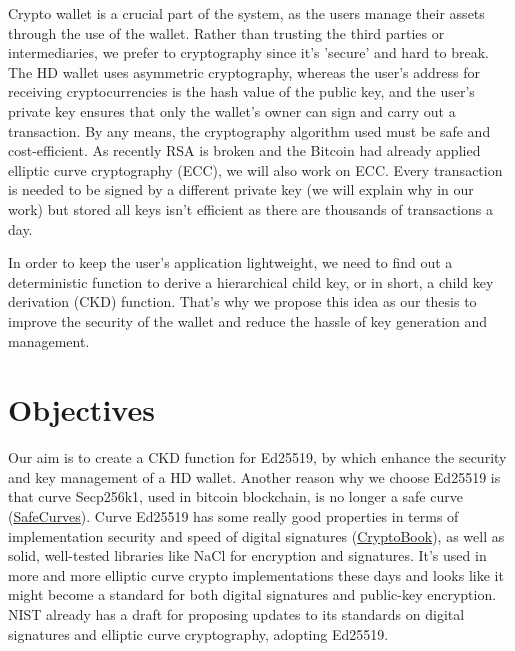 Crypto wallet is a crucial part of the system, as the users manage their assets through the use of the wallet. Rather than trusting the third parties or intermediaries, we prefer to cryptography since it's 'secure' and hard to break. The HD wallet uses asymmetric cryptography, whereas the user's address for receiving cryptocurrencies is the hash value of the public key, and the user's private key ensures that only the wallet's owner can sign and carry out a transaction. By any means, the cryptography algorithm used must be safe and cost-efficient. As recently RSA is broken and the Bitcoin had already applied elliptic curve cryptography (ECC), we will also work on ECC. Every transaction is needed to be signed by a different private key (we will explain why in our work) but stored all keys isn't efficient as there are thousands of transactions a day.

In order to keep the user's application lightweight, we need to find out a deterministic function to derive a hierarchical child key, or in short, a child key derivation (CKD) function. That's why we propose this idea as our thesis to improve the security of the wallet and reduce the hassle of key generation and management.

\section{Objectives}


Our aim is to create a CKD function for Ed25519, by which enhance the security and key management of a HD wallet. Another reason why we choose Ed25519 is that curve Secp256k1, used in bitcoin blockchain, is no longer a safe curve (\href{http://safecurves.cr.yp.to/disc.html}{SafeCurves}). Curve Ed25519 has some really good properties in terms of implementation security and speed of digital signatures (\href{https://cryptobook.nakov.com/digital-signatures/eddsa-and-ed25519}{CryptoBook}), as well as solid, well-tested libraries like NaCl for encryption and signatures. It's used in more and more elliptic curve crypto implementations these days and looks like it might become a standard for both digital signatures and public-key encryption. NIST \cite{DSS2019} already has a draft for proposing updates to its standards on digital signatures and elliptic curve cryptography, adopting Ed25519.

